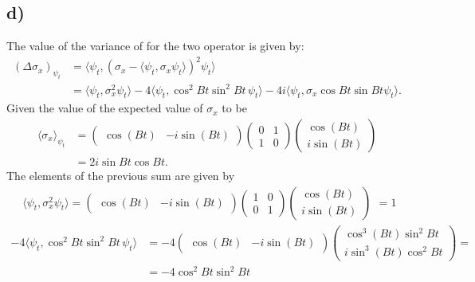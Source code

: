 \documentclass{article}
\begin{document}
\subsection*{d)}
The value of the variance of for the two operator is given by:
\[
    \begin{split}
        (\Delta \sigma_x)_{\psi_t} &= \langle \psi_t, (\sigma_x - \langle \psi_t, \sigma_x \psi_t \rangle)^2 \psi_t\rangle\\
        &= \langle \psi_t, \sigma_x^2 \psi_t \rangle - 4\langle \psi_t, \cos^2{Bt} \sin^2{Bt} \, \psi_t \rangle - 4i\langle \psi_t, \sigma_x \cos{Bt} \sin{Bt}\psi_t \rangle.
    \end{split}
\]
Given the value of the expected value of $\sigma_x$ to be
\[ 
    \begin{split}
        \langle \sigma_x \rangle_{\psi_t} &=
    \begin{pmatrix}
            \cos{(Bt)} & -i \sin{(Bt)}
        \end{pmatrix}
        \begin{pmatrix}
            0 & 1\\
            1 & 0
        \end{pmatrix}
        \begin{pmatrix}
            \cos{(Bt)}\\ 
            i \sin{(Bt)}
        \end{pmatrix}\\
        &= 2i \sin{Bt} \cos{Bt}.
    \end{split}
\]
The elements of the previous sum are given by
\[
    \begin{split}
        \langle \psi_t, \sigma_x^2 \psi_t \rangle = \begin{pmatrix}
            \cos{(Bt)} & -i \sin{(Bt)}
        \end{pmatrix}
        \begin{pmatrix}
            1 & 0\\
            0 & 1
        \end{pmatrix}
        \begin{pmatrix}
            \cos{(Bt)}\\ 
            i \sin{(Bt)}
        \end{pmatrix}
    \end{split} = 1
\]
\[
\begin{split}
     -4\langle \psi_t, \cos^2{Bt} \sin^2{Bt} \, \psi_t \rangle &= -4 \begin{pmatrix}
            \cos{(Bt)} & -i \sin{(Bt)}
        \end{pmatrix}
        \begin{pmatrix}
            \cos^3{(Bt)} \sin^2{Bt}\\ 
            i \sin^3{(Bt)} \cos^2{Bt}
        \end{pmatrix} = \\
        &= -4 \cos^2{Bt} \sin^2{Bt}
\end{split}
\]
\end{document}
